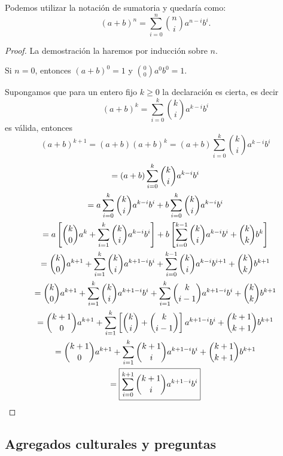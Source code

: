 Podemos utilizar la notación de sumatoria y quedaría como:
\[(a + b)^n = \sum\limits_{i = 0}^{n} \binom{n}{i}a^{n - i}b^i.\]

\begin{proof}
    La demostración la haremos por inducción sobre $n$.

    Si $n = 0$, entonces $(a + b)^0 = 1$ y $\binom{0}{0}a^0 b^0 = 1$.

    Supongamos que para un entero fijo $k \geq 0$ la declaración es cierta, es decir
    \[(a + b)^k = \sum\limits_{i = 0}^{k} \binom{k}{i}a^{k - i}b^i\]
    es válida, entonces
    \[(a + b)^{k + 1} = (a + b)(a + b)^k = (a + b) \sum\limits_{i = 0}^{k} \binom{k}{i}a^{k - i}b^i\]
    \begin{gather*}
        = (a + b) \sum\limits_{i = 0}^{k} \binom{k}{i}a^{k - i}b^i\\
        = a\sum\limits_{i = 0}^{k} \binom{k}{i}a^{k - i}b^i + b\sum\limits_{i = 0}^{k} \binom{k}{i}a^{k - i}b^i\\
        = a\left[\binom{k}{0}a^{k} + \sum\limits_{i = 1}^{k} \binom{k}{i}a^{k - i}b^i\right] + b\left[\sum\limits_{i = 0}^{k - 1} \binom{k}{i}a^{k - i}b^i + \binom{k}{k}b^k\right]\\
        = \binom{k}{0}a^{k + 1} + \sum\limits_{i = 1}^{k} \binom{k}{i}a^{k + 1 - i}b^i+ \sum\limits_{i = 0}^{k - 1} \binom{k}{i}a^{k - i}b^{i + 1} + \binom{k}{k}b^{k + 1} \\
        = \binom{k}{0}a^{k + 1} + \sum\limits_{i = 1}^{k} \binom{k}{i}a^{k + 1 - i}b^i+ \sum\limits_{i = 1}^{k} \binom{k}{i - 1}a^{k + 1 - i}b^{i} + \binom{k}{k}b^{k + 1} \\
        = \binom{k + 1}{0}a^{k + 1} + \sum\limits_{i = 1}^{k} \left[ \binom{k}{i} + \binom{k}{i - 1}\right] a^{k + 1 - i}b^i + \binom{k + 1}{k + 1}b^{k + 1} \\
        = \binom{k + 1}{0}a^{k + 1} + \sum\limits_{i = 1}^{k} \binom{k + 1}{i} a^{k + 1 - i}b^i + \binom{k + 1}{k + 1}b^{k + 1} \\
        = \boxed{\sum\limits_{i = 0}^{k + 1} \binom{k + 1}{i} a^{k + 1 - i}b^i} \qedhere
    \end{gather*}
\end{proof}



\subsection{Agregados culturales y preguntas}

